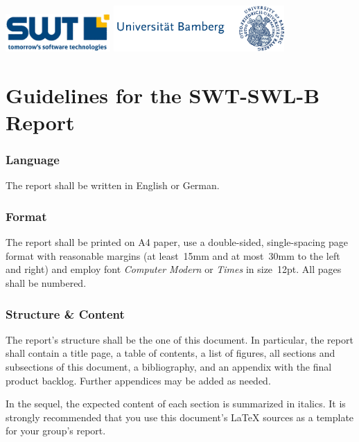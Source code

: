 \pagestyle{empty} %
\includegraphics[width=4cm]{logo}\hfill
\includegraphics[width=6.5cm]{uni-bamberg-logo-de}\\
\section*{\centering Guidelines for the SWT-SWL-B Report}

\vfill
\subsubsection*{Language}
The report shall be written in English or German.

\subsubsection*{Format}

The report shall be printed on A4 paper, use a double-sided, single-spacing page format with reasonable margins (at least~15mm and at most~30mm to the left and right) and employ font \emph{Computer Modern} or \emph{Times} in size~12pt. All pages shall be numbered.

\subsubsection*{Structure \& Content}
The report's structure shall be the one of this document. In particular, the report shall contain a title page, a table of contents, a list of figures, all sections and subsections of this document, a bibliography, and an appendix with the final product backlog.  Further appendices may be added as needed.

In the sequel, the expected content of each section is summarized in italics.  It is strongly recommended that you use this document's {\LaTeX} sources as a template for your group's report.

